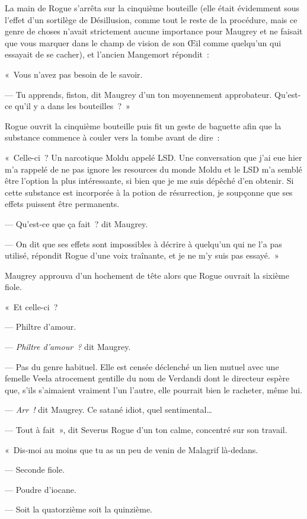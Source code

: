 La main de Rogue s'arrêta sur la cinquième bouteille (elle était évidemment sous l'effet d'un sortilège de Désillusion, comme tout le reste de la procédure, mais ce genre de choses n'avait strictement aucune importance pour Maugrey et ne faisait que vous marquer dans le champ de vision de son Œil comme quelqu'un qui essayait de se cacher), et l'ancien Mangemort répondit~:

«~Vous n'avez pas besoin de le savoir.

--- Tu apprends, fiston, dit Maugrey d'un ton moyennement approbateur. Qu'est-ce qu'il y a dans les bouteilles~?~»

Rogue ouvrit la cinquième bouteille puis fit un geste de baguette afin que la substance commence à couler vers la tombe avant de dire~:

«~Celle-ci~? Un narcotique Moldu appelé LSD. Une conversation que j'ai eue hier m'a rappelé de ne pas ignore les resources du monde Moldu et le LSD m'a semblé être l'option la plus intéressante, si bien que je me suis dépêché d'en obtenir. Si cette substance est incorporée à la potion de résurrection, je soupçonne que ses effets puissent être permanents.

--- Qu'est-ce que ça fait~? dit Maugrey.

--- On dit que ses effets sont impossibles à décrire à quelqu'un qui ne l'a pas utilisé, répondit Rogue d'une voix traînante, et je ne m'y suis pas essayé.~»

Maugrey approuva d'un hochement de tête alors que Rogue ouvrait la sixième fiole.

«~Et celle-ci~?

--- Philtre d'amour.

--- \emph{Philtre d'amour~?} dit Maugrey.

--- Pas du genre habituel. Elle est censée déclenché un lien mutuel avec une femelle Veela atrocement gentille du nom de Verdandi dont le directeur espère que, s'ils s'aimaient vraiment l'un l'autre, elle pourrait bien le racheter, même lui.

--- \emph{Arr~!}  dit Maugrey. Ce satané idiot, quel sentimental…

--- Tout à fait~», dit Severus Rogue d'un ton calme, concentré sur son travail.

«~Dis-moi au moins que tu as un peu de venin de Malagrif là-dedans.

--- Seconde fiole.

--- Poudre d'iocane.

--- Soit la quatorzième soit la quinzième.

